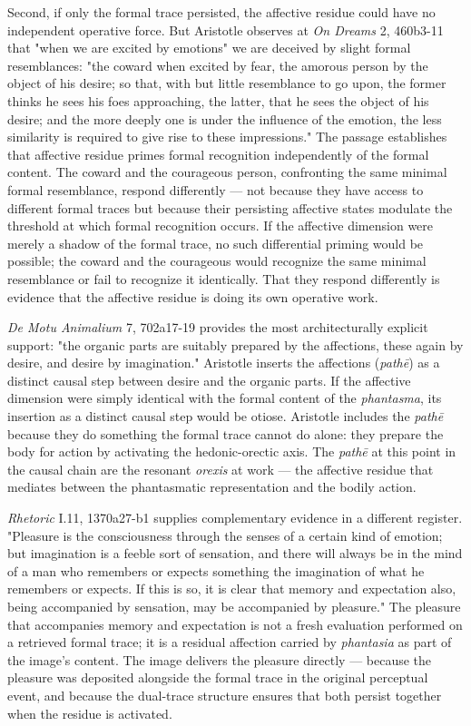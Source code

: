 \documentclass[12pt]{article}
\begin{document}
Second, if only the formal trace persisted, the affective residue could have no independent operative force. But Aristotle observes at \textit{On Dreams} 2, 460b3-11 that "when we are excited by emotions" we are deceived by slight formal resemblances: "the coward when excited by fear, the amorous person by the object of his desire; so that, with but little resemblance to go upon, the former thinks he sees his foes approaching, the latter, that he sees the object of his desire; and the more deeply one is under the influence of the emotion, the less similarity is required to give rise to these impressions." The passage establishes that affective residue primes formal recognition independently of the formal content. The coward and the courageous person, confronting the same minimal formal resemblance, respond differently --- not because they have access to different formal traces but because their persisting affective states modulate the threshold at which formal recognition occurs. If the affective dimension were merely a shadow of the formal trace, no such differential priming would be possible; the coward and the courageous would recognize the same minimal resemblance or fail to recognize it identically. That they respond differently is evidence that the affective residue is doing its own operative work.

\textit{De Motu Animalium} 7, 702a17-19 provides the most architecturally explicit support: "the organic parts are suitably prepared by the affections, these again by desire, and desire by imagination." Aristotle inserts the affections (\textit{pathē}) as a distinct causal step between desire and the organic parts. If the affective dimension were simply identical with the formal content of the \textit{phantasma}, its insertion as a distinct causal step would be otiose. Aristotle includes the \textit{pathē} because they do something the formal trace cannot do alone: they prepare the body for action by activating the hedonic-orectic axis. The \textit{pathē} at this point in the causal chain are the resonant \textit{orexis} at work --- the affective residue that mediates between the phantasmatic representation and the bodily action.

\textit{Rhetoric} I.11, 1370a27-b1 supplies complementary evidence in a different register. "Pleasure is the consciousness through the senses of a certain kind of emotion; but imagination is a feeble sort of sensation, and there will always be in the mind of a man who remembers or expects something the imagination of what he remembers or expects. If this is so, it is clear that memory and expectation also, being accompanied by sensation, may be accompanied by pleasure." The pleasure that accompanies memory and expectation is not a fresh evaluation performed on a retrieved formal trace; it is a residual affection carried by \textit{phantasia} as part of the image's content. The image delivers the pleasure directly --- because the pleasure was deposited alongside the formal trace in the original perceptual event, and because the dual-trace structure ensures that both persist together when the residue is activated.
\end{document}
